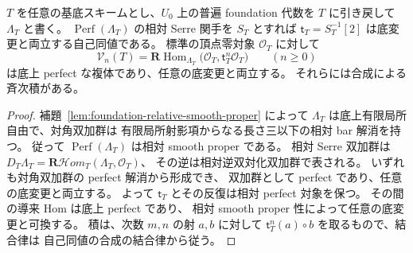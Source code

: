 \begin{lemma}
\label{lem:foundation-relative-antiserre-perfect}
$T$ を任意の基底スキームとし、$U_0$ 上の普遍 foundation 代数を
$T$ に引き戻して $\Lambda_T$ と書く。
$\operatorname{Perf}(\Lambda_T)$ の相対 Serre 関手を $S_T$ とすれば
$\mathsf t_T=S_T^{-1}[2]$ は底変更と両立する自己同値である。
標準の頂点零対象 $\mathcal O_T$ に対して
\[
 \mathscr V_n(T)=
 \mathbf R\operatorname{Hom}_{\Lambda_T}
   \bigl(\mathcal O_T,\mathsf t_T^n\mathcal O_T\bigr)
 \qquad(n\ge0)
 \tag{F-AS}\label{eq:foundation-relative-antiserre}
\]
は底上 perfect な複体であり、任意の底変更と両立する。
それらには合成による斉次積がある。
\end{lemma}
\begin{proof}
補題~\ref{lem:foundation-relative-smooth-proper} によって
$\Lambda_T$ は底上有限局所自由で、対角双加群は
有限局所射影項からなる長さ三以下の相対 bar 解消を持つ。
従って $\operatorname{Perf}(\Lambda_T)$ は相対 smooth proper である。
相対 Serre 双加群は
$D_T\Lambda_T=\mathbf R\mathcal Hom_T(\Lambda_T,\mathcal O_T)$、
その逆は相対逆双対化双加群で表される。
いずれも対角双加群の perfect 解消から形成でき、
双加群として perfect であり、任意の底変更と両立する。
よって $\mathsf t_T$ とその反復は相対 perfect 対象を保つ。
その間の導来 Hom は底上 perfect であり、
相対 smooth proper 性によって任意の底変更と可換する。
積は、次数 $m,n$ の射 $a,b$ に対して
$\mathsf t_T^n(a)\circ b$ を取るもので、結合律は
自己同値の合成の結合律から従う。
\end{proof}


